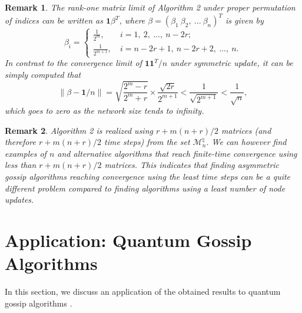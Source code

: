 \documentclass[a4paper, 11pt]{article}
\newtheorem{remark}{Remark}
\begin{document}
\begin{remark}
The rank-one matrix limit of Algorithm 2 under proper  permutation of indices can be written as $\mathbf{1} \beta ^T$, where $\beta=(\beta_1\ \beta_2,\ ...\ \beta_n)^T$ is given by
$$
\beta_i=
\begin{cases}
\frac{1}{2^{m}}, &\ i=1,\ 2,\ ...,\ n-2r;\\
\frac{1}{2^{m+1}}, &\ i=n-2r+1,\ n-2r+2,\ ...,\ n.
\end{cases}
$$
In contrast to the convergence limit of $\mathbf{1} \mathbf{1}^T/n$ under symmetric update, it can be simply computed that
$$
\Big\|\beta- \mathbf{1}/n\Big\|=\sqrt{\frac{2^m-r}{2^m+r}}\times \frac{\sqrt{2r}}{2^{m+1}}<\frac{1}{\sqrt{2^{m+1}}}<\frac{1}{\sqrt{n}},
$$
which goes to zero as the network size tends to infinity.
\end{remark}

\begin{remark}
Algorithm 2 is realized using  $r+m(n+r)/2$ matrices (and therefore $r+m(n+r)/2$ time steps) from the set $\mathscr{M}_n^\natural$. We can however find examples of $n$ and alternative algorithms that reach finite-time convergence using less than $r+m(n+r)/2$ matrices. This indicates that finding asymmetric  gossip algorithms reaching  convergence using the least time steps can be a quite different problem compared to finding algorithms using a least number of node updates.
\end{remark}


















\section{Application: Quantum Gossip Algorithms}\label{Sec:Quantum}
In this section, we discuss {an} application of the obtained results to quantum gossip algorithms \cite{Mazzarella2013a,Mazzarella2013b}.
\end{document}
